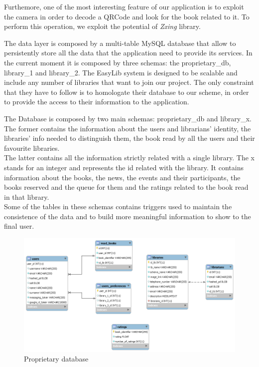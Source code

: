 Furthemore, one of the most interesting feature of our application is to exploit the camera in order to decode a QRCode and look for the book related to it. To perform this operation, we exploit the potential of \emph{Zxing} library.

The data layer is composed by a multi-table MySQL database that allow to persistently store all the data that the application need to provide its services. In the current moment it is composed by three schemas: the proprietary\_db, library\_1 and library\_2. The EasyLib system is designed to be scalable and include any number of libraries that want to join our project. The only constraint that they have to follow is to homologate their database to our scheme, in order to provide the access to their information to the application. 

The Database is composed by two main schemas: proprietary\_db and library\_x. The former contains the information about the users and librarians’ identity, the libraries’ info needed to distinguish them, the book read by all the users and their favourite libraries.\\
The latter contains all the information strictly related with a single library. The x stands for an integer and represents the id related with the library. It contains information about the books, the news, the events and their participants, the books reserved and the queue for them and the ratings related to the book read in that library.\\
Some of the tables in these schemas contains triggers used to maintain the consistence of the data and to build more meaningful information to show to the final user. 


\vspace*{0cm}
\begin{figure}[H]
	\centering
	\includegraphics[scale=0.50]{Images/Diagrams/proprietary_db_UML}
	\caption{Proprietary database}
\end{figure}

